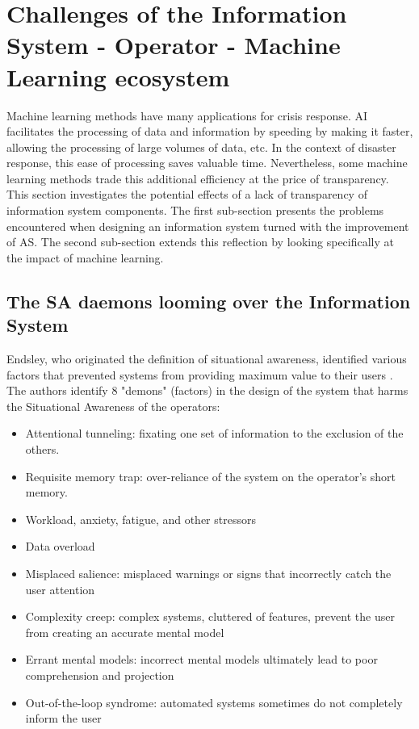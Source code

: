 \section{Challenges of the Information System - Operator - Machine Learning ecosystem}
Machine learning methods have many applications for crisis response.
AI facilitates the processing of data and information by speeding by making it faster, allowing the processing of large volumes of data, etc.
In the context of disaster response, this ease of processing saves valuable time.
Nevertheless, some machine learning methods trade this additional efficiency at the price of transparency.
This section investigates the potential effects of a lack of transparency of information system components.
The first sub-section presents the problems encountered when designing an information system turned with the improvement of AS.
The second sub-section extends this reflection by looking specifically at the impact of machine learning.

\subsection{The SA daemons looming over the Information System}
Endsley, who originated the definition of situational awareness, identified various factors that prevented systems from providing maximum value to their users \parencite{endsleyDesigningSituationAwareness2016}.
The authors identify 8 "demons" (factors) in the design of the system that harms the Situational Awareness of the operators:

\begin{itemize}
    \item Attentional tunneling: fixating one set of information to the exclusion of the others.
    \item Requisite memory trap: over-reliance of the system on the operator's short memory.
    \item Workload, anxiety, fatigue, and other stressors
    \item Data overload
    \item Misplaced salience: misplaced warnings or signs that incorrectly catch the user attention
    \item Complexity creep: complex systems, cluttered of features, prevent the user from creating an accurate mental model
    \item Errant mental models: incorrect mental models ultimately lead to poor comprehension and projection
    \item Out-of-the-loop syndrome: automated systems sometimes do not completely inform the user
\end{itemize}

